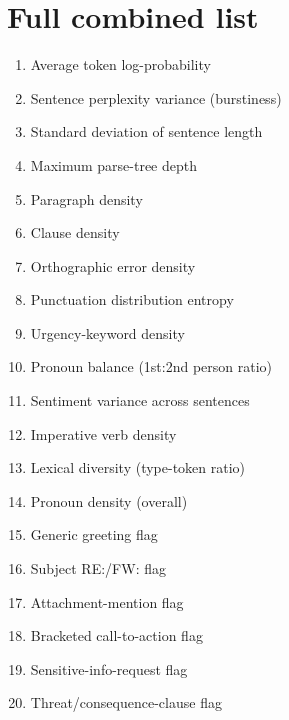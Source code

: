 \documentclass[11pt]{article}
\begin{document}
\section{Full combined list}
\begin{enumerate}
\setlength\itemsep{2pt}
\item Average token log-probability
\item Sentence perplexity variance (burstiness)
\item Standard deviation of sentence length
\item Maximum parse-tree depth
\item Paragraph density
\item Clause density
\item Orthographic error density
\item Punctuation distribution entropy
\item Urgency-keyword density
\item Pronoun balance (1st:2nd person ratio)
\item Sentiment variance across sentences
\item Imperative verb density
\item Lexical diversity (type-token ratio)
\item Pronoun density (overall)
\item Generic greeting flag
\item Subject RE:/FW: flag
\item Attachment-mention flag
\item Bracketed call-to-action flag
\item Sensitive-info-request flag
\item Threat/consequence-clause flag
\end{enumerate}
\end{document}
